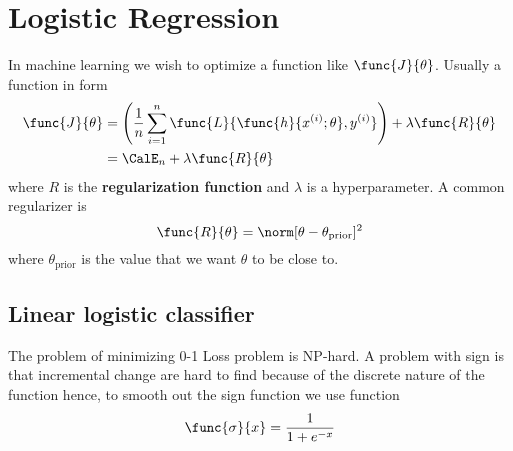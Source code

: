 \chapter{Logistic Regression}
In machine learning we wish to optimize a function like \(\func{J}{\theta}\). Usually a function in form
\begin{align*}
    \func{J}{\theta} & = \left(\dfrac{1}{n} \sum_{i = 1}^n \func{L}{\func{h}{x^{(i)}; \theta} , y^{(i)}} \right) + \lambda \func{R}{\theta} \\
                     & = \CalE_n + \lambda \func{R}{\theta}
\end{align*}
where \(R\) is the \textbf{regularization function} and \(\lambda\) is a hyperparameter. A common regularizer is
\begin{equation*}
    \func{R}{\theta} = \norm[\theta - \theta_{\mathrm{prior}}]^2
\end{equation*}
where \(\theta_{\mathrm{prior}}\) is the value that we want \(\theta\) to be close to.

\section{Linear logistic classifier}
The problem of minimizing 0-1 Loss problem is NP-hard. A problem with sign is that incremental change are hard to find because of the discrete nature of the function hence, to smooth out the sign function we use  function
\begin{equation*}
    \func{\sigma}{x} = \dfrac{1}{1 + e^{-x}}
\end{equation*}
\begin{center}
\end{center}


